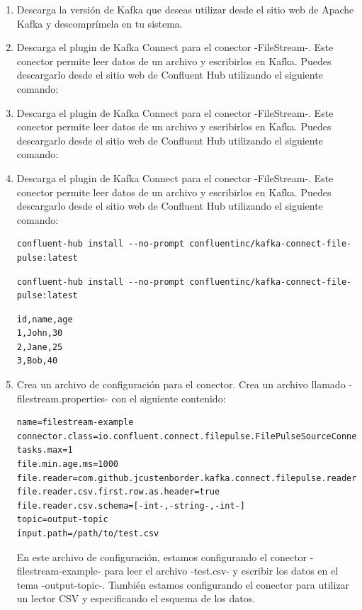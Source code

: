 \documentclass{article}
\begin{document}
\begin{enumerate}
\item Descarga la versión de Kafka que deseas utilizar desde el sitio web de Apache Kafka y descomprímela en tu sistema.
\item Descarga el plugin de Kafka Connect para el conector -FileStream-. Este conector permite leer datos de un archivo y escribirlos en Kafka. Puedes descargarlo desde el sitio web de Confluent Hub utilizando el siguiente comando:
\item Descarga el plugin de Kafka Connect para el conector -FileStream-. Este conector permite leer datos de un archivo y escribirlos en Kafka. Puedes descargarlo desde el sitio web de Confluent Hub utilizando el siguiente comando:
\item Descarga el plugin de Kafka Connect para el conector -FileStream-. Este conector permite leer datos de un archivo y escribirlos en Kafka. Puedes descargarlo desde el sitio web de Confluent Hub utilizando el siguiente comando:
\begin{lstlisting}[numbers=none]
confluent-hub install --no-prompt confluentinc/kafka-connect-file-pulse:latest
\end{lstlisting}
\begin{lstlisting}[numbers=none]
confluent-hub install --no-prompt confluentinc/kafka-connect-file-pulse:latest
\end{lstlisting}
\begin{lstlisting}[numbers=none]
id,name,age
1,John,30
2,Jane,25
3,Bob,40
\end{lstlisting}
\item Crea un archivo de configuración para el conector. Crea un archivo llamado -filestream.properties- con el siguiente contenido:
\begin{lstlisting}[numbers=none]
name=filestream-example
connector.class=io.confluent.connect.filepulse.FilePulseSourceConnector
tasks.max=1
file.min.age.ms=1000
file.reader=com.github.jcustenborder.kafka.connect.filepulse.reader.CsvFileInputReader
file.reader.csv.first.row.as.header=true
file.reader.csv.schema=[-int-,-string-,-int-]
topic=output-topic
input.path=/path/to/test.csv
\end{lstlisting}

En este archivo de configuración, estamos configurando el conector -filestream-example- para leer el archivo -test.csv- y escribir los datos en el tema -output-topic-. También estamos configurando el conector para utilizar un lector CSV y especificando el esquema de los datos.


\end{enumerate}
\end{document}
